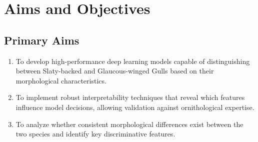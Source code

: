 \documentclass[a4paper,12pt]{article}
\begin{document}
\section*{Aims and Objectives}

\subsection*{Primary Aims}
\begin{enumerate}
    \item To develop high-performance deep learning models capable of distinguishing between Slaty-backed and Glaucous-winged Gulls based on their morphological characteristics.
    \item To implement robust interpretability techniques that reveal which features influence model decisions, allowing validation against ornithological expertise.
    \item To analyze whether consistent morphological differences exist between the two species and identify key discriminative features.
\end{enumerate}
\end{document}
